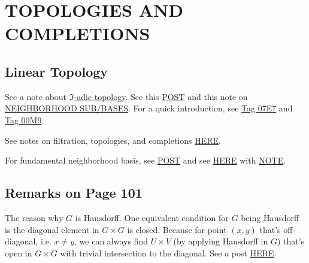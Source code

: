 
\section{TOPOLOGIES AND COMPLETIONS}

\subsection{Linear Topology}

See a note about \href{https://math.gsu.edu/fenescu/commalglectures/8250Lect2.pdf}{$\mathfrak I$-adic topology}. See this \href{https://math.stackexchange.com/questions/4775023/linear-topology#:~:text=Definition%3A%20A%20linear%20topology%20τ,consisting%20of%20submodules%20of%20M.}{POST} and this note on \href{http://alpha.math.uga.edu/%7Epete/TopSection5.pdf}{NEIGHBORHOOD SUB/BASES}. For a quick introduction, see \href{https://stacks.math.columbia.edu/tag/07E7}{Tag 07E7} and \href{https://stacks.math.columbia.edu/tag/00M9}{Tag 00M9}. 

See notes on filtration, topologies, and completions \href{https://www.math.uchicago.edu/~may/MISC/Topologies.pdf}{HERE}. 

For fundamental neighborhood basis, see \href{https://math.stackexchange.com/questions/22957/topology-defined-by-a-fundamental-system-of-neighbourhoods-of-zero-in-a-topologi}{POST} and see \href{https://math.stackexchange.com/questions/69518/how-can-you-construct-a-topology-from-a-fundamental-system-of-neighborhoods?rq=1}{HERE} with \href{http://alpha.math.uga.edu/%7Epete/TopSection5.pdf}{NOTE}.

\subsection{Remarks on Page 101}

The reason why $G$ is Hausdorff. 
One equivalent condition for $G$ being Hausdorff is the diagonal element in $G\times G$ is closed. 
Because for point $(x,y)$ that's off-diagonal, i.e. $x\neq y$, we can always find $U\times V$ (by applying Hausdorff in $G$) that's open in $G\times G$ with trivial intersection to the diagonal. See a post \href{https://math.stackexchange.com/questions/136922/x-is-hausdorff-if-and-only-if-the-diagonal-of-x-times-x-is-closed}{HERE}.

